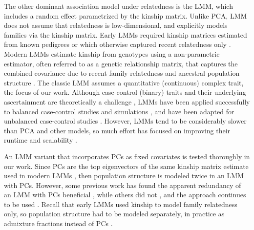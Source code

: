 \documentclass[11pt]{article}
\begin{document}
The other dominant association model under relatedness is the LMM, which includes a random effect parametrized by the kinship matrix.
Unlike PCA, LMM does not assume that relatedness is low-dimensional, and explicitly models families via the kinship matrix.
Early LMMs required kinship matrices estimated from known pedigrees or which otherwise captured recent relatedness only \citep{yu_unified_2006, zhao_arabidopsis_2007}.
Modern LMMs estimate kinship from genotypes using a non-parametric estimator, often referred to as a genetic relationship matrix, that captures the combined covariance due to recent family relatedness and ancestral population structure \citep{kang_efficient_2008, astle_population_2009, ochoa_estimating_2021}.
The classic LMM assumes a quantitative (continuous) complex trait, the focus of our work.
Although case-control (binary) traits and their underlying ascertainment are theoretically a challenge \citep{yang_advantages_2014}, LMMs have been applied successfully to balanced case-control studies \citep{astle_population_2009, kang_variance_2010} and simulations \citep{price_new_2010, wu_comparison_2011, sul_mixed_2013}, and have been adapted for unbalanced case-control studies \citep{zhou_efficiently_2018}.
However, LMMs tend to be considerably slower than PCA and other models, so much effort has focused on improving their runtime and scalability \citep{aulchenko_genomewide_2007, kang_efficient_2008, kang_variance_2010, zhang_mixed_2010, lippert_fast_2011, yang_gcta:_2011, listgarten_improved_2012, zhou_genome-wide_2012, svishcheva_rapid_2012, loh_efficient_2015, zhou_efficiently_2018}.

An LMM variant that incorporates PCs as fixed covariates is tested thoroughly in our work.
Since PCs are the top eigenvectors of the same kinship matrix estimate used in modern LMMs \citep{astle_population_2009, hoffman_correcting_2013}, then population structure is modeled twice in an LMM with PCs.
However, some previous work has found the apparent redundancy of an LMM with PCs beneficial \citep{price_new_2010, tucker_improving_2014}, while others did not \citep{liu_controlling_2011}, and the approach continues to be used \citep{zeng_signatures_2018}.
Recall that early LMMs used kinship to model family relatedness only, so population structure had to be modeled separately, in practice as admixture fractions instead of PCs \citep{yu_unified_2006, zhao_arabidopsis_2007}.
\end{document}
